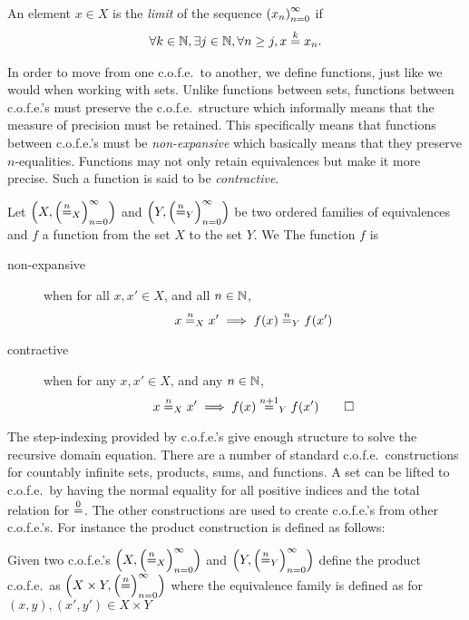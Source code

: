 \begin{jversion}
\begin{definition}
  An element $x \in X$ is the \emph{limit} of the sequence $\seq{x}$ if
  \begin{align*}
    \forall k \in \nats, \exists j \in \nats, \forall n \geq j, x \nequal[k] x_n.
  \end{align*}
\end{definition}
In order to move from one c.o.f.e.\ to another, we define functions, just like we would when working with sets.
Unlike functions between sets, functions between c.o.f.e.'s must preserve the c.o.f.e.\ structure which informally means that the measure of precision must be retained.
This specifically means that functions between c.o.f.e.'s must be \emph{non-expansive} which basically means that they preserve $n$-equalities.
Functions may not only retain equivalences but make it more precise.
Such a function is said to be \emph{contractive}.
\begin{definition}
  \label{def:nonexpansive-contractive-ofe}
  Let $\left(X,\left(\nequal[n]_X\right)_{n=0}^{\infty} \right)$ and $\left(Y,\left(\nequal[n]_Y\right)_{n=0}^{\infty} \right)$ be two ordered families of equivalences and $f$ a function from the set $X$ to the set $Y$.
  We 
  The function $f$ is
  \begin{description}
  \item[non-expansive] when for all $x, x' \in X$, and all $n \in \nats$,
\[
  x \nequal_X x' \implies f(x) \nequal_Y f(x')
\]
  \item[contractive] when for any $x, x' \in X$, and any $n \in \nats$,
\[
  x \nequal_X x' \implies f(x) \nequal[n+1]_Y f(x') 
  \qedhere
\]
  \end{description}
\end{definition}
\noindent The step-indexing provided by c.o.f.e.'s give enough structure to solve the recursive domain equation.
There are a number of standard c.o.f.e.\ constructions for countably infinite sets, products, sums, and functions.
A set can be lifted to c.o.f.e.\ by having the normal equality for all positive indices and the total relation for $\nequal[0]$.
The other constructions are used to create c.o.f.e.'s from other c.o.f.e.'s.
For instance the product construction is defined as follows:
\begin{definition}[Product c.o.f.e.]
\label{def:product-cofe}
Given two c.o.f.e.'s $\left(X, \left(\nequal_X\right)_{n=0}^{\infty} \right)$ and $\left(Y, \left(\nequal_Y\right)_{n=0}^{\infty} \right)$ define the product c.o.f.e.\ as $\left(X \times Y, \left(\nequal \right)_{n=0}^{\infty} \right)$ where the equivalence family is defined as for $(x,y),(x',y') \in X \times Y$

\end{definition}
\end{jversion}
